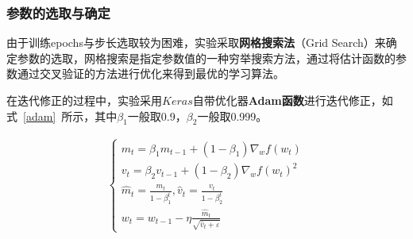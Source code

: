 \documentclass{whutmod}
\begin{document}
	\subsubsection{参数的选取与确定}
	由于训练epochs与步长选取较为困难，实验采取\textbf{网格搜索法}（Grid Search）来确定参数的选取，网格搜索是指定参数值的一种穷举搜索方法，通过将估计函数的参数通过交叉验证的方法进行优化来得到最优的学习算法。
	
	在迭代修正的过程中，实验采用$Keras$自带优化器\textbf{Adam函数}进行迭代修正，如式~\ref{adam}~所示，其中$\beta_{1}$一般取0.9，$\beta_{2}$一般取0.999。
	
	\begin{gather*}\label{adam}
	\left\{\begin{array}{l}{m_{t}=\beta_{1} m_{t-1}+\left(1-\beta_{1}\right) \nabla_{w} f\left(w_{t}\right)} \\ {v_{t}=\beta_{2} v_{t-1}+\left(1-\beta_{2}\right) \nabla_{w} f\left(w_{t}\right)^{2}} \\ {\widehat{m}_{t}=\frac{m_{t}}{1-\beta_{1}^{t}}, \hat{v}_{t}=\frac{v_{t}}{1-\beta_{2}^{t}}} \\ {w_{t}=w_{t-1}-\eta \frac{\widehat{m}_{t}}{\sqrt{\hat{v}_{t}+\varepsilon}}}\end{array}\right.
	\end{gather*}
\end{document}

